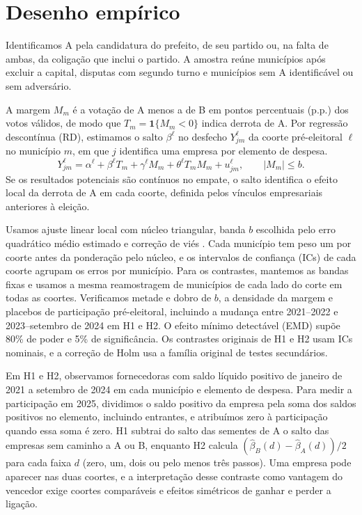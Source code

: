 \documentclass[10pt,a4paper]{article}
\begin{document}
\section{Desenho empírico}
Identificamos A pela candidatura do prefeito, de seu partido ou, na falta de ambas, da coligação
que inclui o partido. A amostra reúne \munAnalisaveis{} municípios após excluir a capital,
disputas com segundo turno e municípios sem A identificável ou sem adversário.

A margem $M_m$ é a votação de A menos a de B em pontos percentuais (p.p.) dos votos válidos,
de modo que $T_m=\mathbf{1}\{M_m<0\}$ indica derrota de A. Por regressão descontínua (RD),
estimamos o salto $\beta^\ell$ no desfecho $Y_{jm}^\ell$ da coorte pré-eleitoral $\ell$ no
município $m$, em que $j$ identifica uma empresa por elemento de despesa.
\begin{equation}
Y_{jm}^{\ell}=\alpha^{\ell}+\beta^{\ell}T_m+\gamma^{\ell}M_m+\theta^{\ell}T_mM_m+u_{jm}^{\ell},
\qquad |M_m|\le b.
\end{equation}
Se os resultados potenciais são contínuos no empate, o salto identifica o efeito local da derrota
de A em cada coorte, definida pelos vínculos empresariais anteriores à eleição.

Usamos ajuste linear local com núcleo triangular, banda $b$ escolhida pelo erro quadrático médio
estimado e correção de viés \cite{calonico2014}. Cada município tem peso um por coorte antes da
ponderação pelo núcleo, e os intervalos de confiança (ICs) de cada coorte agrupam os erros por
município. Para os contrastes, mantemos as bandas fixas e usamos a mesma reamostragem de
municípios de cada lado do corte em todas as coortes. Verificamos metade e dobro de $b$, a
densidade da margem \cite{cattaneo2020} e placebos de participação pré-eleitoral, incluindo a
mudança entre 2021--2022 e 2023--setembro de 2024 em H1 e H2. O efeito mínimo detectável (EMD)
supõe 80\% de poder e 5\% de significância. Os contrastes originais de H1 e H2 usam ICs nominais,
e a correção de Holm usa a família original de testes secundários.
\leituraDensidade{}

Em H1 e H2, observamos fornecedoras com saldo líquido positivo de janeiro de 2021 a setembro de
2024 em cada município e elemento de despesa. Para medir a participação em 2025, dividimos o saldo
positivo da empresa pela soma dos saldos positivos no elemento, incluindo entrantes, e atribuímos
zero à participação quando essa soma é zero. H1 subtrai do salto das sementes de A o salto das
empresas sem caminho a A ou B, enquanto H2 calcula $(\hat\beta_B(d)-\hat\beta_A(d))/2$ para cada
faixa $d$ (zero, um, dois ou pelo menos três passos). Uma empresa pode aparecer nas duas coortes,
e a interpretação desse contraste como vantagem do vencedor exige coortes comparáveis e efeitos
simétricos de ganhar e perder a ligação.
\end{document}
